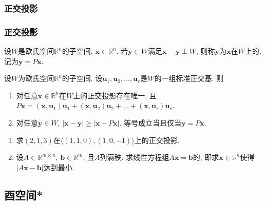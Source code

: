 \subsubsection{正交投影}
\begin{frame}\frametitle{正交投影}
\begin{definition}[正交投影]
设\(W\)是欧氏空间\(\mathbb{R}^n\)的子空间, \(\boldsymbol{x} \in \mathbb{R}^n\). 若\(\boldsymbol{y} \in W\)满足\(\boldsymbol{x}-\boldsymbol{y} \perp W\), 则称\(\boldsymbol{y}\)为\(\boldsymbol{x}\)在\(W\)上的, 记为\(\boldsymbol{y} = P\boldsymbol{x}\).
\end{definition}
\pp
\begin{theorem}[存在、唯一]
设\(W\)为欧氏空间\(\mathbb{R}^n\)的子空间. 设\(\boldsymbol{u}_1,\boldsymbol{u}_2,\ldots,\boldsymbol{u}_r\)是$W$的一组标准正交基. \pp 则
\begin{enumerate}
\item 对任意\(\boldsymbol{x} \in \mathbb{R}^n\)在\(W\)上的正交投影存在唯一, 且 \\
$P\boldsymbol{x} = (\boldsymbol{x},\boldsymbol{u}_1)\boldsymbol{u}_1 + (\boldsymbol{x},\boldsymbol{u}_2)\boldsymbol{u}_2 + \ldots + (\boldsymbol{x},\boldsymbol{u}_r)\boldsymbol{u}_r.$ \pp
\item  对任意\(\boldsymbol{y} \in W\),
$|\boldsymbol{x} - \boldsymbol{y}| \geq |\boldsymbol{x} - P\boldsymbol{x}|$.
等号成立当且仅当\(\boldsymbol{y} = P\boldsymbol{x}\).
\end{enumerate}
\end{theorem}
\pp
\begin{example}
\begin{enumerate}
\item 求$(2,1,3)$在$\langle(1,1,0),(1,0,-1)\rangle$上的正交投影. \pp
\item 设\(A \in \mathbb{R}^{m\times n}\), \(\boldsymbol{b} \in \mathbb{R}^m\), 且\(A\)列满秩. 求线性方程组\(A\boldsymbol{x} = \boldsymbol{b}\)的, 即求\(\boldsymbol{x} \in \mathbb{R}^n\)使得\(\vert A\boldsymbol{x}-\boldsymbol{b}\vert\)达到最小.
\end{enumerate}
\end{example}
\pp
{}
\end{frame}



\subsection{酉空间*}

